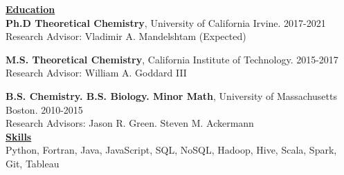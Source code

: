 \documentclass[letterpaper]{article}
\begin{document}

{\large \textbf{\underline{Education}}}\\

\textbf{Ph.D  Theoretical Chemistry}, University of California Irvine.
\hfill 2017-2021\\
Research Advisor: Vladimir A. Mandelshtam \null \hfill (Expected)\\
\vspace{0.1in}

\textbf{M.S. Theoretical Chemistry}, California Institute of Technology.
\hfill 2015-2017 \\
Research Advisor: William A. Goddard III\\
\vspace{0.1in}

\textbf{B.S. Chemistry. B.S. Biology. Minor Math}, University of
Massachusetts Boston. \hfill 2010-2015\\
Research Advisors: Jason R. Green. Steven M. Ackermann\\

{\large \textbf{\underline{Skills}}}\\
Python, Fortran, Java, JavaScript, SQL, NoSQL, Hadoop, Hive, Scala, Spark, Git, Tableau
\end{document}
